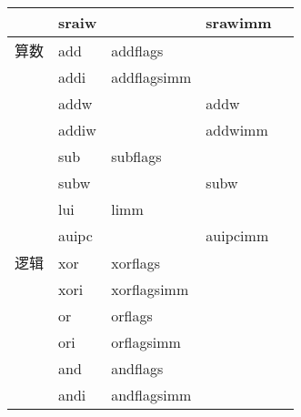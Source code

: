 \begin{longtable}{lllll}
                               & sraiw                            &                              & srawimm                        \\
                               \hline
    算数                         & add                              & addflags                     &                                \\
                               & addi                             & addflagsimm                  &                                \\
                               & addw                             &                              & addw                           \\
                               & addiw                            &                              & addwimm                        \\
                               & sub                              & subflags                     &                                \\
                               & subw                             &                              & subw                           \\
                               & lui                              & limm                         &                                \\
                               & auipc                            &                              & auipcimm                       \\
                               \hline
    逻辑                         & xor                              & xorflags                     &                                \\
                               & xori                             & xorflagsimm                  &                                \\
                               & or                               & orflags                      &                                \\
                               & ori                              & orflagsimm                   &                                \\
                               & and                              & andflags                     &                                \\
                               & andi                             & andflagsimm                  &                                \\

\end{longtable}
